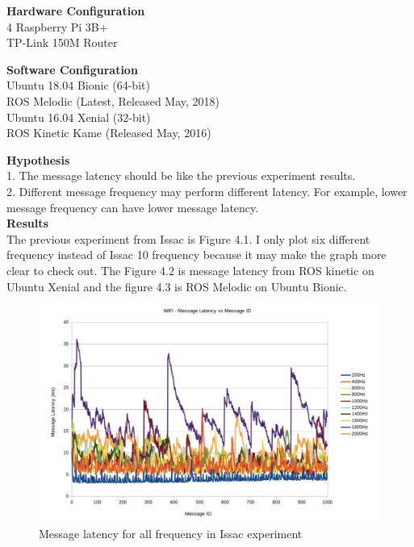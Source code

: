 \documentclass{mproj}
\begin{document}
\textbf{Hardware Configuration} \\
4 Raspberry Pi 3B+ \\
TP-Link 150M Router

\textbf{Software Configuration} \\
Ubuntu 18.04 Bionic (64-bit)\\
ROS Melodic (Latest, Released May, 2018) \\
Ubuntu 16.04 Xenial (32-bit) \\
ROS Kinetic Kame (Released May, 2016)

\textbf{Hypothesis} \\
1. The message latency should be like the previous experiment results. \\
2. Different message frequency may perform different latency. For example, lower message frequency can have lower message latency. \\
\textbf{Results} \\
The previous experiment from Issac is Figure 4.1. I only plot six different frequency instead of Issac 10 frequency because it may make the graph more clear to check out. The Figure 4.2 is message latency from ROS kinetic on Ubuntu Xenial and the figure 4.3 is ROS Melodic on Ubuntu Bionic.


\begin{figure}[h!]
\centering
\includegraphics[width = 1\textwidth]{ex1_issac.png}
\caption{Message latency for all frequency in Issac experiment}
\end{figure}
\end{document}
